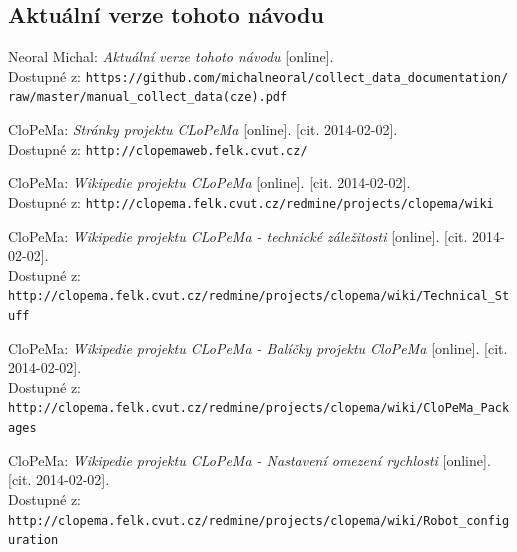 \documentclass[10pt,a4paper,titlepage,oneside]{report}
\begin{document}
\begin{thebibliography}{00}

\section{Aktuální verze tohoto návodu}


   Neoral Michal:
    \emph{Aktuální verze tohoto návodu} [online]. \\
    Dostupné z: \verb|https://github.com/michalneoral/collect_data_documentation/|\\
	\verb|raw/master/manual_collect_data(cze).pdf|

   CloPeMa:
    \emph{Stránky projektu CLoPeMa} [online]. [cit. 2014-02-02].\\
    Dostupné z: \verb|http://clopemaweb.felk.cvut.cz/|

   CloPeMa:
    \emph{Wikipedie projektu CLoPeMa} [online]. [cit. 2014-02-02].\\
    Dostupné z: \verb|http://clopema.felk.cvut.cz/redmine/projects/clopema/wiki|
    
   CloPeMa:
    \emph{Wikipedie projektu CLoPeMa - technické záležitosti} [online]. [cit. 2014-02-02].\\
    Dostupné z: \verb|http://clopema.felk.cvut.cz/redmine/projects/clopema/wiki/Technical_Stuff|
    
   CloPeMa:
    \emph{Wikipedie projektu CLoPeMa - Balíčky projektu CloPeMa} [online]. [cit. 2014-02-02].\\
    Dostupné z: \verb|http://clopema.felk.cvut.cz/redmine/projects/clopema/wiki/CloPeMa_Packages|    

   CloPeMa:
    \emph{Wikipedie projektu CLoPeMa - Nastavení omezení rychlosti} [online]. [cit. 2014-02-02].\\
    Dostupné z: \verb|http://clopema.felk.cvut.cz/redmine/projects/clopema/wiki/Robot_configuration|  


\end{thebibliography}
\end{document}
